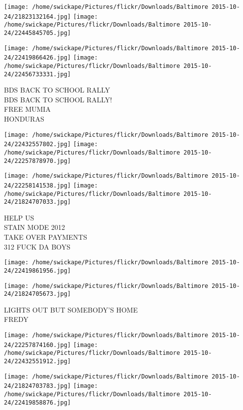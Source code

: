\documentclass[10pt,letterpaper]{article}
\begin{document}
\texttt{[image: /home/swickape/Pictures/flickr/Downloads/Baltimore 2015-10-24/21823132164.jpg]}
\texttt{[image: /home/swickape/Pictures/flickr/Downloads/Baltimore 2015-10-24/22445845705.jpg]}

\texttt{[image: /home/swickape/Pictures/flickr/Downloads/Baltimore 2015-10-24/22419866426.jpg]}
\texttt{[image: /home/swickape/Pictures/flickr/Downloads/Baltimore 2015-10-24/22456733331.jpg]}

BDS BACK TO SCHOOL RALLY\\
BDS BACK TO SCHOOL RALLY!\\
FREE MUMIA\\
HONDURAS\\
\pagebreak

\texttt{[image: /home/swickape/Pictures/flickr/Downloads/Baltimore 2015-10-24/22432557802.jpg]}
\texttt{[image: /home/swickape/Pictures/flickr/Downloads/Baltimore 2015-10-24/22257878970.jpg]}

\texttt{[image: /home/swickape/Pictures/flickr/Downloads/Baltimore 2015-10-24/22258141538.jpg]}
\texttt{[image: /home/swickape/Pictures/flickr/Downloads/Baltimore 2015-10-24/21824707033.jpg]}

HELP US\\
STAIN MODE 2012\\
TAKE OVER PAYMENTS\\
312 FUCK DA BOYS\\
\pagebreak

\texttt{[image: /home/swickape/Pictures/flickr/Downloads/Baltimore 2015-10-24/22419861956.jpg]}

\vspace{0.25in}
\texttt{[image: /home/swickape/Pictures/flickr/Downloads/Baltimore 2015-10-24/21824705673.jpg]}

LIGHTS OUT BUT SOMEBODY'S HOME\\
FREDY\\
\pagebreak

\texttt{[image: /home/swickape/Pictures/flickr/Downloads/Baltimore 2015-10-24/22257874160.jpg]}
\texttt{[image: /home/swickape/Pictures/flickr/Downloads/Baltimore 2015-10-24/22432551912.jpg]}

\texttt{[image: /home/swickape/Pictures/flickr/Downloads/Baltimore 2015-10-24/21824703783.jpg]}
\texttt{[image: /home/swickape/Pictures/flickr/Downloads/Baltimore 2015-10-24/22419858876.jpg]}
\end{document}

